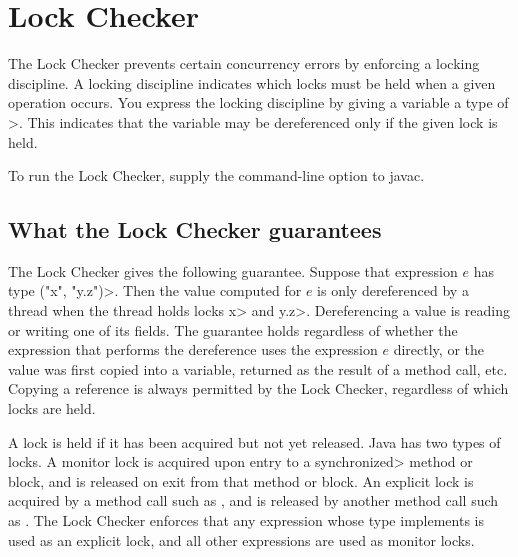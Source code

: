 \htmlhr
\chapter{Lock Checker\label{lock-checker}}

The Lock Checker prevents certain concurrency errors by enforcing a
locking discipline.  A locking discipline indicates which locks must be held
when a given operation occurs.  You express the locking discipline by
giving a variable a type of
\<>.
This indicates that the variable may
be dereferenced only if the given lock is held.


To run the Lock Checker, supply the
command-line option to javac.


\section{What the Lock Checker guarantees\label{lock-guarantees}}

The Lock Checker gives the following guarantee.
Suppose that expression $e$ has type
\<(\ttlcb"x", "y.z"\ttrcb)>.
Then the value computed for $e$ is only dereferenced by a thread when the
thread holds locks \<x> and \<y.z>.
Dereferencing a value is reading or writing one of its fields.
The guarantee holds regardless of whether the expression that performs the dereference uses the expression $e$
directly, or the value was first copied into a variable, returned as the
result of a method call, etc.
Copying a reference is always
permitted by the Lock Checker, regardless of which locks are held.

A lock is held if it has been acquired but not yet released.
Java has two types of locks.
A monitor lock is acquired upon entry to a \<synchronized> method or block,
and is released on exit from that method or block.
An explicit lock is acquired by a method call such as
,
and is released by another method call such as
.
The Lock Checker enforces that any expression whose type implements
 is used as an
explicit lock, and all other expressions are used as monitor locks.

